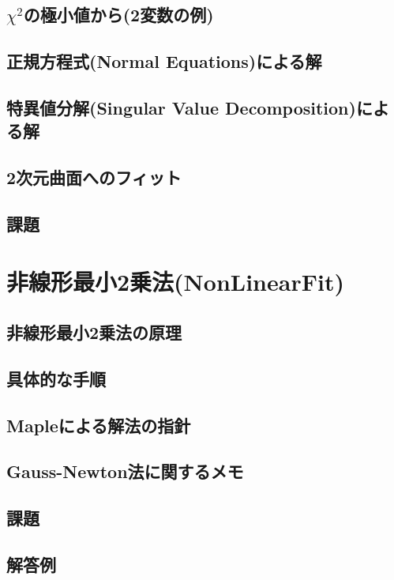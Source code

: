 \documentclass[10pt,a4j]{jsbook}
\begin{document}
\section{$\chi^2$の極小値から(2変数の例)}
 
\section{正規方程式(Normal Equations)による解}
 
\section{特異値分解(Singular Value Decomposition)による解}
 
\section{2次元曲面へのフィット}
 
\section{課題}
 


\chapter{非線形最小2乗法(NonLinearFit)}
\section{非線形最小2乗法の原理}
 
\section{具体的な手順}
 
\section{Mapleによる解法の指針}
 
\section{Gauss-Newton法に関するメモ}
 
\section{課題}
 
\section{解答例}
 
\end{document}
